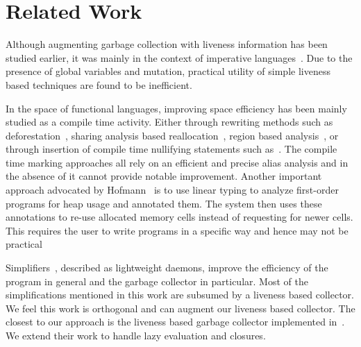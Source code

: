 \documentclass[preprint,9pt]{sigplanconf}
\begin{document}
\section{Related Work} 
\label{sec:relatedwork}
Although  augmenting garbage  collection with  liveness
information has been studied  earlier, it was mainly in
the   context  of   imperative  languages~\cite{Albert,
  Hirzel,  khedker07heap}.   Due  to  the  presence  of
global  variables and  mutation,  practical utility  of
simple  liveness  based  techniques  are  found  to  be
inefficient.

In the  space of functional languages,  improving space
efficiency has  been mainly  studied as a  compile time
activity.   Either through  rewriting  methods such  as
deforestation~\cite{wadler88deforest,gill93ashort,chitil99deforest},
sharing                  analysis                 based
reallocation~\cite{jones89compile},     region    based
analysis~\cite{tofte98region}, or  through insertion of
compile     time     nullifying     statements     such
as~\cite{inoue88analysis,lee05static,Hamilton}.     The
compile  time   marking  approaches  all  rely   on  an
efficient and precise alias analysis and in the absence
of  it  cannot  provide  notable  improvement.  Another
important         approach         advocated         by
Hofmann~\cite{HofmannJ03}  is to  use linear  typing to
analyze  first-order   programs  for  heap   usage  and
annotated them. The system  then uses these annotations
to re-use allocated memory  cells instead of requesting
for  newer  cells.  This  requires the  user  to  write
programs  in  a  specific  way and  hence  may  not  be
practical

Simplifiers~\cite{ONeill},  described   as  lightweight
daemons,  improve  the  efficiency of  the  program  in
general and  the garbage collector in  particular. Most
of  the  simplifications  mentioned in  this  work  are
subsumed by  a liveness  based collector. We  feel this
work is  orthogonal and can augment  our liveness based
collector.  The closest to our approach is the liveness
based        garbage       collector        implemented
in~\cite{asati14lgc}.  We extend  their work  to handle
lazy evaluation and closures.
 
\end{document}
